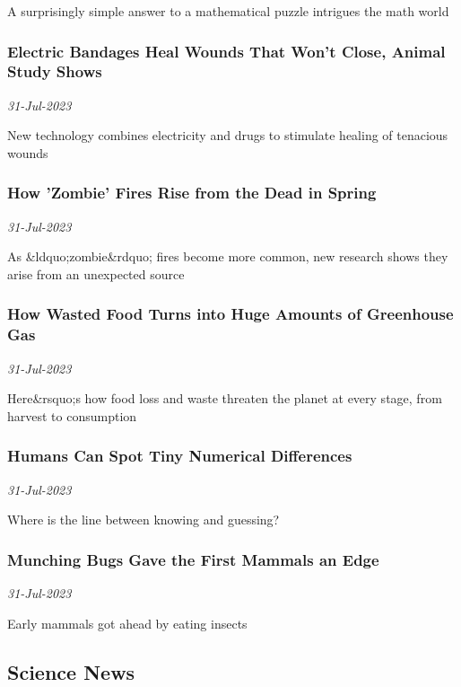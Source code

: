 A surprisingly simple answer to a mathematical puzzle intrigues the math world
\subsubsection{Electric Bandages Heal Wounds That Won't Close, Animal Study Shows \href{https://www.scientificamerican.com/article/electric-bandages-heal-wounds-that-wont-close-animal-study-shows/}{}}
\textit{31-Jul-2023}

New technology combines electricity and drugs to stimulate healing of tenacious wounds
\subsubsection{How 'Zombie' Fires Rise from the Dead in Spring \href{https://www.scientificamerican.com/article/how-zombie-fires-rise-from-the-dead-in-spring/}{}}
\textit{31-Jul-2023}

As \&ldquo;zombie\&rdquo; fires become more common, new research shows they arise from an unexpected source
\subsubsection{How Wasted Food Turns into Huge Amounts of Greenhouse Gas \href{https://www.scientificamerican.com/article/how-wasted-food-turns-into-huge-amounts-of-greenhouse-gas/}{}}
\textit{31-Jul-2023}

Here\&rsquo;s how food loss and waste threaten the planet at every stage, from harvest to consumption
\subsubsection{Humans Can Spot Tiny Numerical Differences \href{https://www.scientificamerican.com/article/humans-can-spot-tiny-numerical-differences/}{}}
\textit{31-Jul-2023}

Where is the line between knowing and guessing?
\subsubsection{Munching Bugs Gave the First Mammals an Edge \href{https://www.scientificamerican.com/article/munching-bugs-gave-the-first-mammals-an-edge/}{}}
\textit{31-Jul-2023}

Early mammals got ahead by eating insects
\subsection{Science News \href{https://www.sciencenews.org/}{}}
